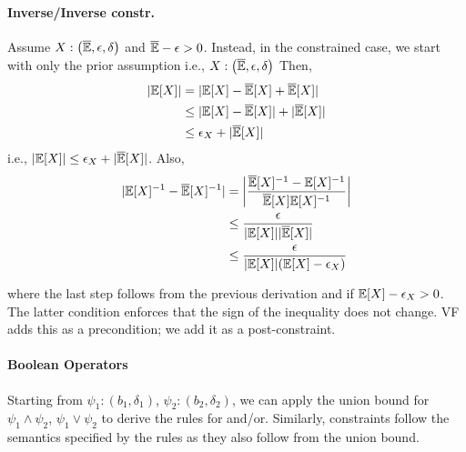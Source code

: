 \paragraph{Inverse/Inverse constr.} Assume $X: \left(\overline{\mathbb{E}}, \epsilon, \delta \right)$ and $\overline{\mathbb{E}} - \epsilon > 0$.
Instead, in the constrained case, we start with only the prior assumption i.e., $X: \left(\overline{\mathbb{E}}, \epsilon, \delta \right)$
Then,
\begin{align*}
    |\mathbb{E}[X]| &= |\mathbb{E}[X] - \overline{\mathbb{E}}[X] + \overline{\mathbb{E}}[X]| \\
    &\leq |\mathbb{E}[X] - \overline{\mathbb{E}}[X]| + |\overline{\mathbb{E}}[X]| \\
    &\leq \epsilon_X + |\overline{\mathbb{E}}[X]|
\end{align*}
i.e., $|\mathbb{E}[X]| \leq \epsilon_X + |\overline{\mathbb{E}}[X]|$. 
Also,
\begin{align*}
    |\mathbb{E}[X]^{-1} - \overline{\mathbb{E}}[X]^{-1}| &= \left|\frac{\overline{\mathbb{E}}[X]^{-1} - \mathbb{E}[X]^{-1}}{\overline{\mathbb{E}}[X]  \mathbb{E}[X]^{-1}}\right| \\
    &\leq \frac{\epsilon}{|\mathbb{E}[X]|  |\overline{\mathbb{E}}[X]|} \\
    &\leq \frac{\epsilon}{|\mathbb{E}[X]| (\mathbb{E}[X] - \epsilon_X)}
\end{align*}

where the last step follows from the previous derivation and if $\mathbb{E}[X] - \epsilon_X > 0$.
The latter condition enforces that the sign of the inequality does not change.
VF adds this as a precondition; we add it as a post-constraint.

\paragraph{Boolean Operators}
Starting from $\psi_1: (b_1, \delta_1)$, $\psi_2: (b_2, \delta_2)$, we can apply the union bound for $\psi_1 \wedge \psi_2$, $\psi_1 \vee \psi_2$ to derive the rules for and/or.
Similarly, constraints follow the semantics specified by the rules as they also follow from the union bound.




